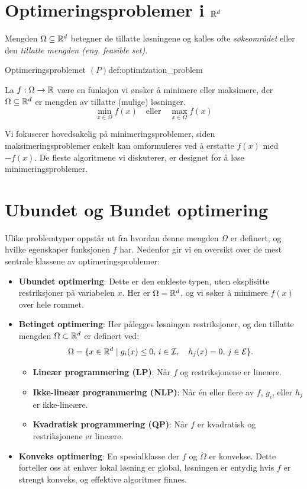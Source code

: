 \section{Optimeringsproblemer i \texorpdfstring{\(\mathbb{R}^d\)}{Rd}}

Mengden \(\Omega \subseteq \mathbb{R}^d\) betegner de tillatte løsningene og kalles ofte \emph{søkeområdet} eller den \emph{tillatte mengden (eng. feasible set)}.

\begin{definition}{Optimeringsproblemet \((P)\)}{def:optimization_problem}

	La \(f: \Omega \to \mathbb{R}\) være en funksjon vi ønsker å minimere eller maksimere, der \(\Omega \subseteq \mathbb{R}^d\) er mengden av tillatte (mulige) løsninger.
	\[
		\min_{x \in \Omega} f(x) \quad \text{eller} \quad \max_{x \in \Omega} f(x) \tag{P}
	\]

\end{definition}

Vi fokuserer hovedsakelig på minimeringsproblemer, siden maksimeringsproblemer enkelt kan omformuleres ved å erstatte \(f(x)\) med \(-f(x)\). 
De fleste algoritmene vi diskuterer, er designet for å løse minimeringsproblemer.

\section{Ubundet og Bundet optimering}
Ulike problemtyper oppstår ut fra hvordan denne mengden \(\Omega\) er definert, og hvilke egenskaper funksjonen \(f\) har. Nedenfor gir vi en oversikt over de mest sentrale klassene av optimeringsproblemer:

\begin{itemize}
	\item \textbf{Ubundet optimering}: Dette er den enkleste typen, uten eksplisitte restriksjoner på variabelen \(x\). Her er \(\Omega = \mathbb{R}^d\), og vi søker å minimere \(f(x)\) over hele rommet.
	\item \textbf{Betinget optimering}: Her pålegges løsningen restriksjoner, og den tillatte mengden \(\Omega \subset \mathbb{R}^d\) er definert ved:
	\[
		\Omega = \{ x \in \mathbb{R}^d \mid g_i(x) \leq 0, \, i \in \mathcal{I}, \quad h_j(x) = 0, \, j \in \mathcal{E} \}.
	\]
	\begin{itemize}
		\item \textbf{Lineær programmering (LP)}: Når \(f\) og restriksjonene er lineære.
		\item \textbf{Ikke-lineær programmering (NLP)}: Når én eller flere av \(f\), \(g_i\), eller \(h_j\) er ikke-lineære.
		\item \textbf{Kvadratisk programmering (QP)}: Når \(f\) er kvadratisk og restriksjonene er lineære.
	\end{itemize}
	\item \textbf{Konveks optimering}: En spesialklasse der \(f\) og \(\Omega\) er konvekse. 
	Dette forteller oss at enhver lokal løsning er global, løsningen er entydig hvis \(f\) er strengt konveks, og effektive algoritmer finnes.
\end{itemize}

